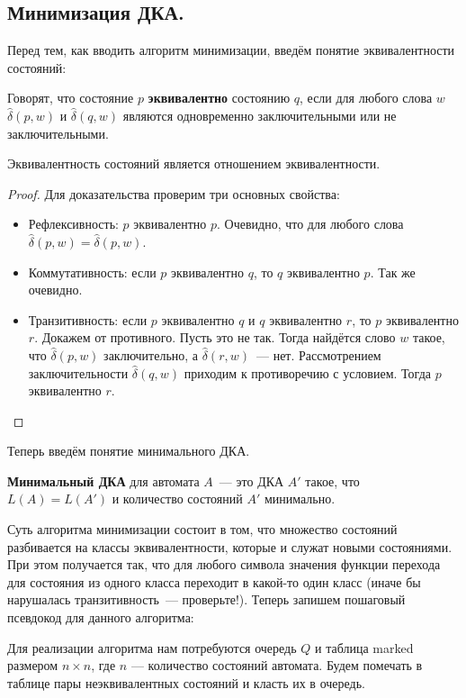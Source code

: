 \documentclass[a4paper,12pt]{article}
\begin{document}
	 \subsection{Минимизация ДКА.}
	Перед тем, как вводить алгоритм минимизации, введём понятие эквивалентности состояний:
	
	Говорят, что состояние $p$ \textbf{эквивалентно} состоянию $q$, если для любого слова $w$ $\hat{\delta}(p, w)$ и $\hat{\delta}(q, w)$ являются одновременно заключительными или не заключительными. 
	
	\begin{theorem}
		Эквивалентность состояний является отношением эквивалентности.
	\end{theorem}
	\begin{proof}
	 	Для доказательства проверим три основных свойства: 
	 	\begin{itemize}
	 		\item Рефлексивность: $p$ эквивалентно $p$. Очевидно, что для любого слова $\hat{\delta}(p, w) = \hat{\delta}(p, w)$.
	 		\item Коммутативность: если $p$ эквивалентно $q$, то $q$ эквивалентно $p$. Так же очевидно.
	 		\item Транзитивность: если $p$ эквивалентно $q$ и $q$ эквивалентно $r$, то $p$ эквивалентно $r$. Докажем от противного. Пусть это не так. Тогда найдётся слово $w$ такое, что $\hat{\delta}(p, w)$ заключительно, а $\hat{\delta}(r, w)$~--- нет. Рассмотрением заключительности $\hat{\delta}(q, w)$ приходим к противоречию с условием. Тогда $p$ эквивалентно $r$. 
	 	\end{itemize}
	\end{proof}
	
	Теперь введём понятие минимального ДКА.
	
	\textbf{Минимальный ДКА} для автомата $A$~--- это ДКА $A'$ такое, что $L(A) = L(A')$ и количество состояний $A'$ минимально.
	
	Суть алгоритма минимизации состоит в том, что множество состояний разбивается на классы эквивалентности, которые и служат новыми состояниями. При этом получается так, что для любого символа значения функции перехода для состояния из одного класса переходит в какой-то один класс (иначе бы нарушалась транзитивность~--- проверьте!). Теперь запишем пошаговый псевдокод для данного алгоритма:
	
	Для реализации алгоритма нам потребуются очередь $Q$ и таблица marked размером $n \times n$, где $n$ — количество состояний автомата. Будем помечать в таблице пары неэквивалентных состояний и класть их в очередь.
	
\end{document}
